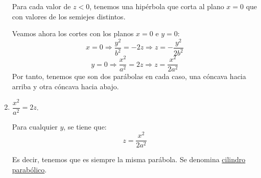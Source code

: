 \begin{enumerate}
    Para cada valor de $z<0$, tenemos una hipérbola que corta al plano $x=0$ que con valores de los semiejes distintos. 

    Veamos ahora los cortes con los planos $x=0$ e $y=0$:
    \begin{equation*}
        x = 0 \Longrightarrow \dfrac{y^2}{b^2} = -2z \Longrightarrow z=-\dfrac{y^2}{2b^2}
    \end{equation*}
    \begin{equation*}
        y = 0 \Longrightarrow \dfrac{x^2}{a^2} = 2z \Longrightarrow z=\dfrac{x^2}{2a^2}
    \end{equation*}
    Por tanto, tenemos que son dos parábolas en cada caso, una cóncava hacia arriba y otra cóncava hacia abajo.
    
    \item $\dfrac{x^2}{a^2} = 2z$.

    Para cualquier $y$, se tiene que:
    \begin{equation*}
        z = \dfrac{x^2}{2a^2}
    \end{equation*}

    Es decir, tenemos que es siempre la misma parábola. Se denomina \ul{cilindro parabólico}.
\end{enumerate}


















